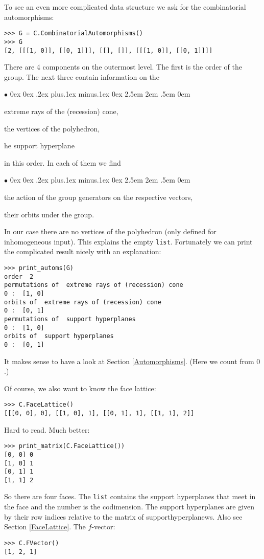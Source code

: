 \documentclass[12pt,a4paper]{scrartcl}
\newcommand{\stdli}{ \topsep0ex \partopsep0ex %
\parsep.2ex plus.1ex minus.1ex \itemsep0ex%
\leftmargin2.5em \labelwidth2em \labelsep.5em \rightmargin0em}%
\renewenvironment{itemize}{\begin{list}{{$\bullet$}}{\stdli}}{\end{list}}
\theoremstyle{definition}
\begin{document}
\begin{small}
To see an even more complicated data structure we ask for the combinatorial automorphisms:
\begin{Verbatim}
>>> G = C.CombinatorialAutomorphisms()
>>> G
[2, [[[1, 0]], [[0, 1]]], [[], []], [[[1, 0]], [[0, 1]]]]
\end{Verbatim}
There are 4 components on the outermost level. The first is the order of the group. The next three contain information on the 
\begin{itemize}
	\item extreme  rays of the (recession) cone,
	\item the vertices of the polyhedron,
	\item he support hyperplane
\end{itemize}
in this order. In each of them we find 
\begin{itemize}
	\item the action of the group  generators on the respective vectors,
	\item  their orbits under the group.
\end{itemize}
In our case there are no vertices of the polyhedron (only defined for inhomogeneous input). This explains the empty \verb|list|. Fortunately we can print the complicated result nicely with an explanation:
\begin{Verbatim}
>>> print_automs(G)
order  2
permutations of  extreme rays of (recession) cone
0 :  [1, 0]
orbits of  extreme rays of (recession) cone
0 :  [0, 1]
permutations of  support hyperplanes
0 :  [1, 0]
orbits of  support hyperplanes
0 :  [0, 1]
\end{Verbatim}
It makes sense to have a look at Section \ref{Automorphisms}. (Here we count from $0$.)

Of course, we also want to know the face lattice:
\begin{Verbatim}
>>> C.FaceLattice()
[[[0, 0], 0], [[1, 0], 1], [[0, 1], 1], [[1, 1], 2]]
\end{Verbatim}
Hard to read. Much better:
\begin{Verbatim}
>>> print_matrix(C.FaceLattice())
[0, 0] 0
[1, 0] 1
[0, 1] 1
[1, 1] 2
\end{Verbatim}
So there are four faces. The \verb|list|  contains the support hyperplanes that meet in the face and the number is the codimension. The support hyperplanes are given by their row indices relative to the matrix of supporthyperplanews. Also see Section \ref{FaceLattice}. The $f$-vector:
\begin{Verbatim}
>>> C.FVector()
[1, 2, 1]
\end{Verbatim}


\end{small}
\end{document}
